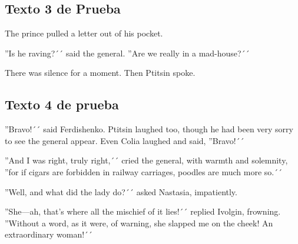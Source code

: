 \documentclass[a4paper,twocolumn]{article}
\begin{document}
    \subsection{Texto 3 de Prueba}\label{subsec:texto3}

    The prince pulled a letter out of his pocket.

    ''Is he raving?´´ said the general. ''Are we really in a mad-house?´´

    There was silence for a moment. Then Ptitsin spoke.

    \subsection{Texto 4 de prueba}\label{subsec:texto4}

    ''Bravo!´´ said Ferdishenko. Ptitsin laughed too, though he had been very
    sorry to see the general appear. Even Colia laughed and said, ''Bravo!´´

    ''And I was right, truly right,´´ cried the general, with warmth and
    solemnity, ''for if cigars are forbidden in railway carriages, poodles
    are much more so.´´

    ''Well, and what did the lady do?´´ asked Nastasia, impatiently.

    ''She—ah, that’s where all the mischief of it lies!´´ replied Ivolgin, frowning.
    ''Without a word, as it were, of warning, she slapped me on the cheek! An extraordinary woman!´´

    \newpage
\end{document}
